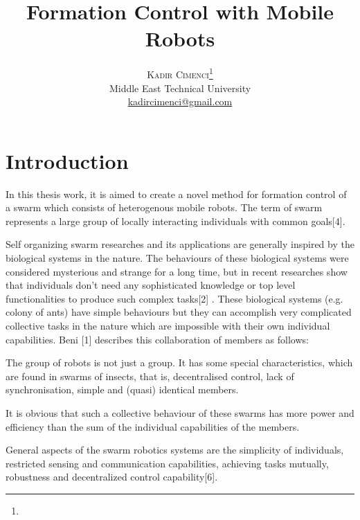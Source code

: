 \documentclass[twoside]{article}
\title{\vspace{-15mm}\fontsize{24pt}{10pt}\selectfont\textbf{Formation Control with Mobile Robots}} %
\author{
	\large
	\textsc{Kadir Cimenci}\thanks{}\\[2mm] %
	\normalsize Middle East Technical University \\ %
	\normalsize \href{mailto:kadircimenci@gmail.com}{kadircimenci@gmail.com} %
	\vspace{-5mm}
}
\date{}
\begin{document}
	
	\maketitle %
	
	\thispagestyle{fancy} %
	

	
	

		
		\section{Introduction}
	
In this thesis work, it is aimed to create a novel method for formation control of a swarm which consists of heterogenous mobile robots. The term of swarm represents a large group of locally interacting individuals with common goals[4]. 

Self organizing swarm researches and its applications are generally inspired by the biological systems in the nature. 
The behaviours of these biological systems were considered mysterious and strange for a long time, but in recent researches show that individuals don't need any sophisticated knowledge or top level functionalities to produce such complex tasks[2] . These biological systems (e.g. colony of ants) have simple behaviours but they can accomplish very complicated collective tasks in the nature which are impossible with their own individual capabilities. Beni [1] describes this collaboration of members as follows:

The group of robots is not just a group. It has some special characteristics, which are found in swarms of insects, that is, decentralised control, lack of synchronisation, simple and (quasi) identical members.

It is obvious that such a collective behaviour of these swarms has more power and efficiency than the sum of the individual capabilities of the members. 

General aspects of the swarm robotics systems are the simplicity of individuals, restricted sensing and communication capabilities, achieving tasks mutually, robustness and decentralized control capability[6].
\end{document}

